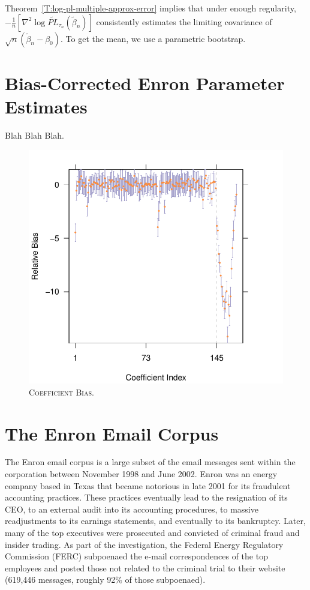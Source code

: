 \documentclass[aoas,preprint]{imsart}
\begin{document}
Theorem~\ref{T:log-pl-multiple-approx-error} implies that under enough
regularity,
\(
    -\tfrac{1}{n} [
        \nabla^2 \log \widetilde{\mathit{PL}}_{\tau_n}(\tilde \beta_n)
    ]
\)
consistently estimates the limiting covariance
of $\sqrt{n}(\tilde \beta_n - \beta_0)$.  To get the mean, we use
a parametric bootstrap.

\section{Bias-Corrected Enron Parameter Estimates}

Blah Blah Blah.

\begin{figure}
    \includegraphics[scale=0.6]{figures/coef-bias}
    \caption{
        \textsc{Coefficient Bias.}
    }
    \label{F:coef-bias}
\end{figure}

\clearpage

\appendix

\section{The Enron Email Corpus}\label{S:enron-corpus}

The Enron email corpus is a large subset of the email messages sent within the
corporation between November 1998 and June 2002. Enron was an energy company
based in Texas that became notorious in late 2001 for its fraudulent
accounting practices. These practices eventually lead to the resignation of
its CEO, to an external audit into its accounting procedures, to massive
readjustments to its earnings statements, and eventually to its bankruptcy.
Later, many of the top executives were prosecuted and convicted of criminal
fraud and insider trading. As part of the investigation, the Federal Energy
Regulatory Commission (FERC) subpoenaed the e-mail correspondences of the top
employees and posted those not related to the criminal trial to their website
(619,446 messages, roughly 92\% of those subpoenaed).
\end{document}
